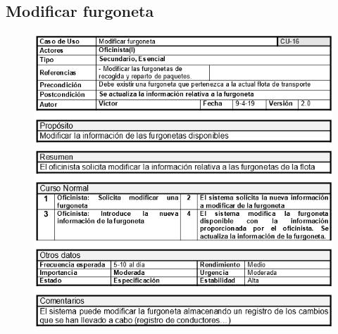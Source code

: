 \subsection{Modificar furgoneta}
\begin{figure}[H]
	\centering
	\includegraphics[width=16cm]{16}
\end{figure}
